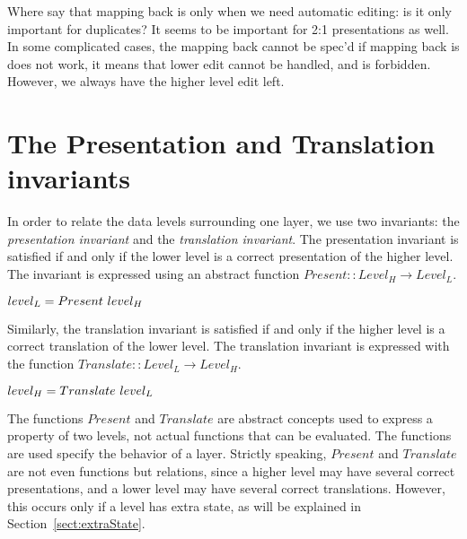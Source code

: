 \bc
Where say that mapping back is only when we need automatic editing: is it only important for duplicates? It seems to be important for 2:1 presentations as well.  In some complicated cases, the mapping back cannot be spec'd if mapping back is does not work, it means that lower edit cannot be handled, and is forbidden. However, we always have the higher level edit left.
\ec

%																
%																
%																
\section{The Presentation and Translation invariants}


In order to relate the data levels surrounding one layer, we use two invariants: the {\em presentation invariant} and the {\em translation invariant}. The presentation invariant is satisfied if and only if the lower level is a correct presentation of the higher level. The invariant is expressed using an abstract function 
$Present ::  Level_{H} \rightarrow Level_{L}$.

\begin{small}\begin{math}
level_{L} = Present~level_{H}\\
\end{math}\end{small}

Similarly, the translation invariant is satisfied if and only if the higher level is a correct translation of the lower level. The translation invariant is expressed with the function 
$Translate ::  Level_{L} \rightarrow Level_{H}$.

\begin{small}\begin{math}
level_{H} = Translate~level_{L}\\
\end{math}\end{small}

The functions $Present$ and $Translate$ are abstract concepts used to express a property of two levels, not actual functions that can be evaluated. The functions are used specify the behavior of a layer.
Strictly speaking, $Present$ and $Translate$ are not even functions but relations, since a higher level may have several correct presentations, and a lower level may have several correct translations. However, this occurs only if a level has extra state, as will be explained in Section~\ref{sect:extraState}.

